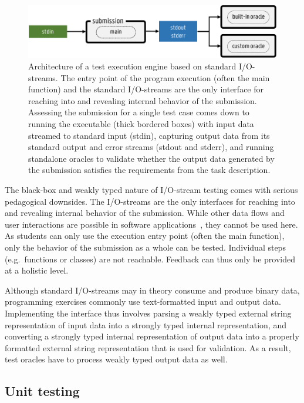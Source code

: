 \documentclass[../main]{subfiles}
\begin{document}
\begin{figure}
    \centering
    \includegraphics[width=\textwidth]{io-testing}
    \caption{Architecture of a test execution engine based on standard I/O-streams. The entry point of the program execution (often the main function) and the standard I/O-streams are the only interface for reaching into and revealing internal behavior of the submission. Assessing the submission for a single test case comes down to running the executable (thick bordered boxes) with \textcolor{input-green}{input data} streamed to standard input (stdin), capturing \textcolor{output-blue}{output data} from its standard output and error streams (stdout and stderr), and running standalone oracles to validate whether the output data generated by the submission satisfies the requirements from the task description.\label{fig:io-testing}}
\end{figure}

The black-box and weakly typed nature of I/O-stream testing comes with serious pedagogical downsides.
The I/O-streams are the only interfaces for reaching into and revealing internal behavior of the submission.
While other data flows and user interactions are possible in software applications~\autocite{khorramTestingFrameworkExecutable2022}, they cannot be used here.
As students can only use the execution entry point (often the main function), only the behavior of the submission as a whole can be tested.
Individual steps (e.g.\ functions or classes) are not reachable.
Feedback can thus only be provided at a holistic level.

Although standard I/O-streams may in theory consume and produce binary data, programming exercises commonly use text-formatted input and output data.
Implementing the interface thus involves parsing a weakly typed external string representation of input data into a strongly typed internal representation, and converting a strongly typed internal representation of output data into a properly formatted external string representation that is used for validation.
As a result, test oracles have to process weakly typed output data as well.

\subsection{Unit testing}\label{subsec:dsl-unit-testing}
\end{document}
